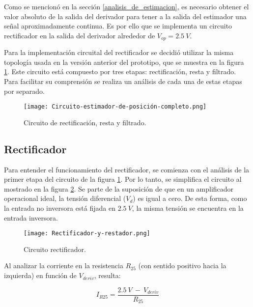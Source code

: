 Como se mencionó en la sección \ref{analisis_de_estimacion}, es necesario obtener el valor absoluto de la salida del derivador para tener a la salida del estimador una señal aproximadamente continua. Es por ello que se implementa un circuito rectificador en la salida del derivador alrededor de $V_{op}=2.5\:V$.

Para la implementación circuital del rectificador se decidió utilizar la misma topología usada en la versión anterior del prototipo, que se muestra en la figura \ref{fig:img_Circuito_estimador_de_posición_completo}. Este circuito está compuesto por tres etapas: rectificación, resta y filtrado. Para facilitar su comprensión se realiza un análisis de cada una de estas etapas por separado.

\begin{figure}[H]
	\centering
	\texttt{[image: Circuito-estimador-de-posición-completo.png]}
	\caption{Circuito de rectificación, resta y filtrado.}
	\label{fig:img_Circuito_estimador_de_posición_completo}
\end{figure}

\subsection{Rectificador}

Para entender el funcionamiento del rectificador, se comienza con el análisis de la primer etapa del circuito de la figura \ref{fig:img_Circuito_estimador_de_posición_completo}. Por lo tanto, se simplifica el circuito al mostrado en la figura \ref{fig:img_Rectificador_y_restador}. Se parte de la suposición de que en un amplificador operacional ideal, la tensión diferencial ($V_d$) es igual a cero. De esta forma, como la entrada no inversora está fijada en $2.5\:V$, la misma tensión se encuentra en la entrada inversora.


\begin{figure}[H]
	\centering
	\texttt{[image: Rectificador-y-restador.png]}
	\caption{Circuito rectificador.}
	\label{fig:img_Rectificador_y_restador}
\end{figure}

Al analizar la corriente en la resistencia $R_{25}$ (con sentido positivo hacia la izquierda) en función de $V_{deriv}$, resulta:

\begin{equation} \label{eq_corriente_r25}
	I_{R25}=\frac{2.5\:V\ -\ V_{deriv}}{R_{25}}
\end{equation}

